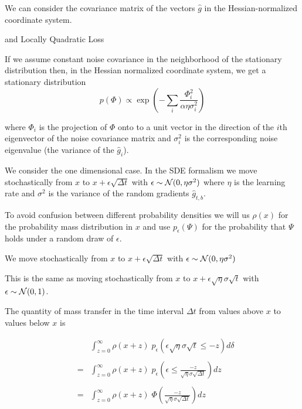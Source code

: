 {\vfill
We can consider the covariance matrix of the vectors $\hat{g}$ in the Hessian-normalized coordinate system.

{and Locally Quadratic Loss}

If we assume constant noise covariance in the neighborhood of the stationary distribution then, in the Hessian normalized
coordinate system, we get a stationary distribution
$$p(\Phi) \propto \exp\left(-\sum_i \frac{{\Phi_i^2}}{\alpha\eta\sigma_i^2}\right)$$

\vfill
where $\Phi_i$ is the projection of $\Phi$ onto to a unit vector in the direction of the $i$th eigenvector of the noise covariance matrix and $\sigma^2_i$
is the corresponding noise eigenvalue (the variance of the $\hat{g}_i$).



{\Large
We consider the one dimensional case. In the SDE formalism we move stochastically from $x$ to $x + \epsilon \sqrt{\Delta t}$ with $\epsilon \sim {\cal N}(0,\eta\sigma^2)$
where $\eta$ is the learning rate and $\sigma^2$ is the variance of the random gradients $\hat{g}_{t,b}$.

\vfill
To avoid confusion between different probability densities we will us $\rho(x)$ for the probability mass distribution in $x$ and use $p_\epsilon(\Psi)$
for the probability that $\Psi$ holds under a random draw of $\epsilon$.

}

{\Large

We move stochastically from $x$ to $x + \epsilon \sqrt{\Delta t}$ with $\epsilon \sim {\cal N}(0,\eta\sigma^2)$

\vfill
This is the same as moving stochastically from $x$ to $x + \epsilon\sqrt{\eta}\sigma\sqrt{t}$ with $\epsilon \sim {\cal N}(0,1)$.

\vfill
The quantity of mass transfer in the time interval $\Delta t$ from values above $x$ to values below $x$ is


\begin{eqnarray*}
& & \int_{z = 0}^\infty  \rho(x + z)\;p_\epsilon(\epsilon\sqrt{\eta}\sigma\sqrt{t} \leq -z) d\delta  \\
\\
& = & \int_{z = 0}^\infty  \rho(x + z)\;p_\epsilon\left(\epsilon \leq \frac{-z}{\sqrt{\eta}\sigma\sqrt{\Delta t}}\right) dz  \\
\\
& =  & \int_{z = 0}^\infty \rho(x+z)\;\Phi\left(\frac{-z}{\sqrt{\eta}\sigma\sqrt{\Delta t}}\right) dz
\end{eqnarray*}

}}
